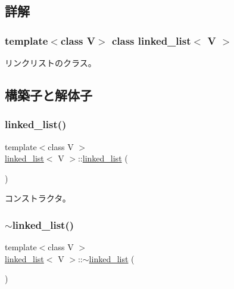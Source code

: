\subsection{詳解}
\subsubsection*{template$<$class V$>$\newline
class linked\+\_\+list$<$ V $>$}

リンクリストのクラス。 

\subsection{構築子と解体子}
\hypertarget{classlinked__list_af003adae8c8ad169c0836a178da51431}{}\label{classlinked__list_af003adae8c8ad169c0836a178da51431} 
\subsubsection{\texorpdfstring{linked\+\_\+list()}{linked\_list()}\hspace{0.1cm}{\footnotesize\ttfamily [1/3]}}
{\footnotesize\ttfamily template$<$class V $>$ \\
\hyperlink{classlinked__list}{linked\+\_\+list}$<$ V $>$\+::\hyperlink{classlinked__list}{linked\+\_\+list} (\begin{DoxyParamCaption}{ }\end{DoxyParamCaption})}

コンストラクタ。 \hypertarget{classlinked__list_adae66055eedccbf29e7efd3692ad60e9}{}\label{classlinked__list_adae66055eedccbf29e7efd3692ad60e9} 
\subsubsection{\texorpdfstring{$\sim$linked\+\_\+list()}{~linked\_list()}}
{\footnotesize\ttfamily template$<$class V $>$ \\
\hyperlink{classlinked__list}{linked\+\_\+list}$<$ V $>$\+::$\sim$\hyperlink{classlinked__list}{linked\+\_\+list} (\begin{DoxyParamCaption}{ }\end{DoxyParamCaption})\hspace{0.3cm}{\ttfamily [virtual]}}

